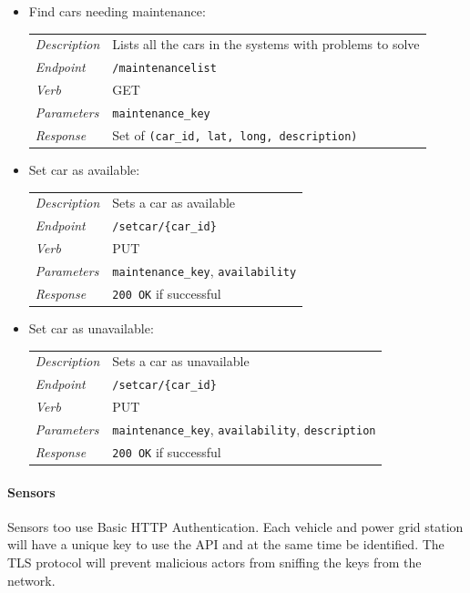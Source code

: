 \documentclass[english]{article}
\newcommand{\code}[1]{\texttt{#1}}
\begin{document}
\begin{itemize}
	\item{Find cars needing maintenance:}\\
	\begin{tabular}{ | l l }
		\textit{Description} & Lists all the cars in the systems with problems to solve\\
		\textit{Endpoint} & \code{/maintenancelist} \\ 
		\textit{Verb} & GET \\  
		\textit{Parameters} & \code{maintenance\_key}  \\
		\textit{Response} & Set of \code{(car\_id, lat, long, description)}
	\end{tabular}
	
	\item{Set car as available:}\\
	\begin{tabular}{ | l l }
		\textit{Description} & Sets a car as available\\
		\textit{Endpoint} & \code{/setcar/\{car\_id\}} \\ 
		\textit{Verb} & PUT \\  
		\textit{Parameters} & \code{maintenance\_key}, \code{availability}  \\
		\textit{Response} & \code{200 OK} if successful
	\end{tabular}
	
	\item{Set car as unavailable:}\\
	\begin{tabular}{ | l l }
		\textit{Description} & Sets a car as unavailable\\
		\textit{Endpoint} & \code{/setcar/\{car\_id\}} \\ 
		\textit{Verb} & PUT \\  
		\textit{Parameters} & \code{maintenance\_key}, \code{availability}, \code{description}  \\
		\textit{Response} & \code{200 OK} if successful
	\end{tabular}
\end{itemize}

\paragraph{Sensors}
Sensors too use Basic HTTP Authentication. Each vehicle and power grid station will have a unique key to use the API and at the same time be identified.
The TLS protocol will prevent malicious actors from sniffing the keys from the network.
\end{document}

